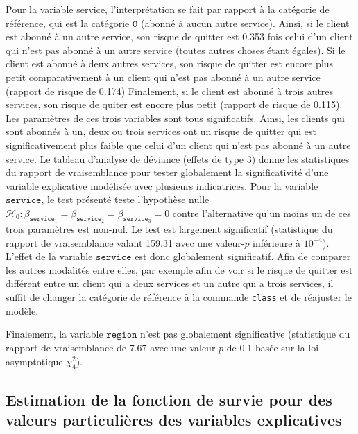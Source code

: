 \documentclass[
  11pt,
  letterpaper,
]{book}
\theoremstyle{definition}
\theoremstyle{remark}
\begin{document}
Pour la variable service, l'interprétation se fait par rapport à la
catégorie de référence, qui est la catégorie \(\texttt{0}\) (abonné à
aucun autre service). Ainsi, si le client est abonné à un autre service,
son risque de quitter est 0.353 fois celui d'un client qui n'est pas
abonné à un autre service (toutes autres choses étant égales). Si le
client est abonné à deux autres services, son risque de quitter est
encore plus petit comparativement à un client qui n'est pas abonné à un
autre service (rapport de risque de 0.174) Finalement, si le client est
abonné à trois autres services, son risque de quiter est encore plus
petit (rapport de risque de 0.115). Les paramètres de ces trois
variables sont tous significatifs. Ainsi, les clients qui sont abonnés à
un, deux ou trois services ont un risque de quitter qui est
significativement plus faible que celui d'un client qui n'est pas abonné
à un autre service. Le tableau d'analyse de déviance (effets de type 3)
donne les statistiques du rapport de vraisemblance pour tester
globalement la significativité d'une variable explicative modélisée avec
plusieurs indicatrices. Pour la variable \(\texttt{service}\), le test
présenté teste l'hypothèse nulle
\(\mathscr{H}_0: \beta_{\texttt{service}_1}=\beta_{\texttt{service}_2}=\beta_{\texttt{service}_3}=0\)
contre l'alternative qu'un moins un de ces trois paramètres est non-nul.
Le test est largement significatif (statistique du rapport de
vraisemblance valant 159.31 avec une valeur-\(p\) inférieure à
\(10^{-4}\)). L'effet de la variable \(\texttt{service}\) est donc
globalement significatif. Afin de comparer les autres modalités entre
elles, par exemple afin de voir si le risque de quitter est différent
entre un client qui a deux services et un autre qui a trois services, il
suffit de changer la catégorie de référence à la commande \texttt{class}
et de réajuster le modèle.

Finalement, la variable \(\texttt{region}\) n'est pas globalement
significative (statistique du rapport de vraisemblance de 7.67 avec une
valeur-\(p\) de 0.1 basée sur la loi asymptotique \(\chi^2_4\)).

\hypertarget{estimation-de-la-fonction-de-survie-pour-des-valeurs-particuliuxe8res-des-variables-explicatives}{%
\subsection{Estimation de la fonction de survie pour des valeurs
particulières des variables
explicatives}\label{estimation-de-la-fonction-de-survie-pour-des-valeurs-particuliuxe8res-des-variables-explicatives}}
\end{document}
